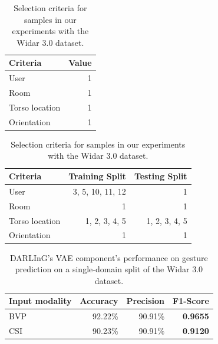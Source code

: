 \begin{table}[t]
	\centering
	\begin{subtable}{0.3\textwidth}
		\centering
		\begin{tabular}{@{}lr@{}}
			\toprule
			Criteria       & Value \\ \midrule
			User           & 1     \\
			Room           & 1     \\
			Torso location & 1     \\
			Orientation    & 1     \\ \bottomrule
		\end{tabular}
		\caption{Single-domain split criteria.}
		\label{tab:single-domain-select}
	\end{subtable}
	\hfill
	\begin{subtable}{0.68\textwidth}
		\centering
		\begin{tabular}{@{}lrr@{}}
			\toprule
			Criteria       & Training Split      & Testing Split \\ \midrule
			User           & 3, 5, 10, 11, 12    & 1             \\
			Room           & 1                   & 1             \\
			Torso location & 1, 2, 3, 4, 5       & 1, 2, 3, 4, 5 \\
			Orientation    & 1                   & 1             \\ \bottomrule
		\end{tabular}
		\caption{Single user leave out criteria.}
		\label{tab:single-user-select}
	\end{subtable}
	\caption{Selection criteria for samples in our experiments with the Widar 3.0 dataset.}

\end{table}

\begin{table}[b]
	\centering
	\begin{tabular}{@{}lrrr@{}}
		\toprule
		Input modality     & Accuracy  & Precision & F1-Score        \\ \midrule
		BVP                & 92.22\%   & 90.91\%   & \textbf{0.9655} \\
		CSI                & 90.23\%   & 90.91\%   & \textbf{0.9120} \\ \bottomrule
	\end{tabular}
	\caption{DARLInG's VAE component's performance on gesture prediction on a single-domain split of the Widar 3.0 dataset.}
	\label{tab:single-domain-performance}
\end{table}

